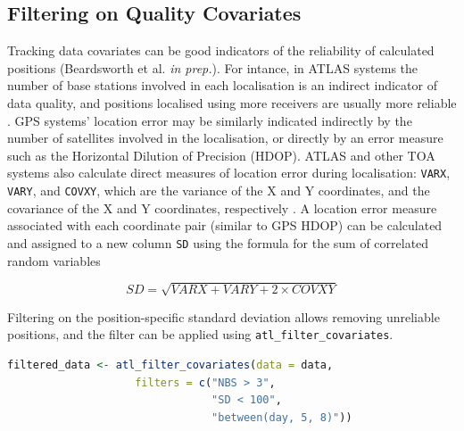 \documentclass[10pt,paper=a4,headings=standardclasses
]{scrartcl}
\begin{document}
\subsection{Filtering on Quality Covariates}

Tracking data covariates can be good indicators of the reliability of calculated positions (Beardsworth et al. \textit{in prep.}).
For intance, in ATLAS systems the number of base stations involved in each localisation is an indirect indicator of data quality, and positions localised using more receivers are usually more reliable \citep[the minimum required for an ATLAS localisation is 3; see][]{weiser2016}.
GPS systems' location error may be similarly indicated indirectly by the number of satellites involved in the localisation, or directly by an error measure such as the Horizontal Dilution of Precision (HDOP).
ATLAS and other TOA systems also calculate direct measures of location error during localisation: \texttt{VARX}, \texttt{VARY}, and \texttt{COVXY}, which are the variance of the X and Y coordinates, and the covariance of the X and Y coordinates, respectively \citep{maccurdy2009, maccurdy2019, weiser2016}.
A location error measure associated with each coordinate pair (similar to GPS HDOP) can be calculated and assigned to a new column \texttt{SD} using the formula for the sum of correlated random variables
\begin{linenomath*}
    \begin{equation*}
        SD = \sqrt{{VARX} + {VARY} + 2 \times {COVXY}}
     \end{equation*}
\end{linenomath*}
Filtering on the position-specific standard deviation allows removing unreliable positions, and the filter can be applied using \texttt{atl\_filter\_covariates}.

\begin{lstlisting}[float, language=R, style=customR, caption = {
    Filtering ATLAS data on position covariates. 
    The \texttt{filters} argument accepts a character vector with the logical statements. 
    The function only retains data for which \textit{all} the conditions are satisfied; here that is positions calculated using $>$ 3 base stations (\texttt{NBS}), with location error (\texttt{SD}) $<$ 100, and data between an arbitrary day 5 and day 8.}]
filtered_data <- atl_filter_covariates(data = data,
                    filters = c("NBS > 3",
                                "SD < 100",
                                "between(day, 5, 8)"))
\end{lstlisting}
\end{document}
